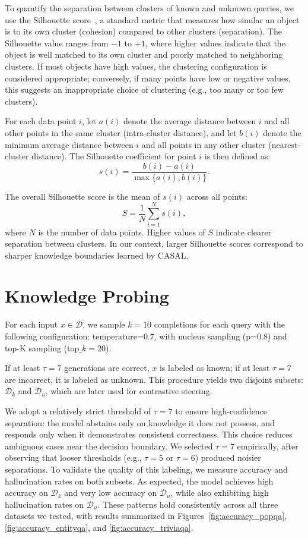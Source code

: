 \documentclass{article} %
\newcommand{\known}[1]{\textcolor{KnownGreen}{#1}}
\newcommand{\unknown}[1]{\textcolor{UnknownRed}{#1}}
\begin{document}
To quantify the separation between clusters of known and unknown queries, we use the Silhouette score~\citep{rousseeuw1987silhouettes}, a standard metric that measures how similar an object is to its own cluster (cohesion) compared to other clusters (separation). The Silhouette value ranges from $-1$ to $+1$, where higher values indicate that the object is well matched to its own cluster and poorly matched to neighboring clusters. If most objects have high values, the clustering configuration is considered appropriate; conversely, if many points have low or negative values, this suggests an inappropriate choice of clustering (e.g., too many or too few clusters).

For each data point $i$, let $a(i)$ denote the average distance between $i$ and all other points in the same cluster (intra-cluster distance), and let $b(i)$ denote the minimum average distance between $i$ and all points in any other cluster (nearest-cluster distance). The Silhouette coefficient for point $i$ is then defined as:
\[
s(i) = \frac{b(i) - a(i)}{\max\{a(i), b(i)\}}.
\]

The overall Silhouette score is the mean of $s(i)$ across all points:
\[
S = \frac{1}{N} \sum_{i=1}^{N} s(i),
\]
where $N$ is the number of data points. Higher values of $S$ indicate clearer separation between clusters. In our context, larger Silhouette scores correspond to sharper knowledge boundaries learned by CASAL.

\newpage

\section{Knowledge Probing}
\label{app:probing}

For each input $x \in \mathcal{D}$, we sample $k=10$ completions for each query with the following configuration:  temperature=0.7, with nucleus sampling (p=0.8) and top-K sampling ($\text{top}\_k=20$).


If at least $\tau=7$ generations are correct, $x$ is labeled as \known{known}; if at least $\tau=7$ are incorrect, it is labeled as \unknown{unknown}. This procedure yields two disjoint subsets: \known{$\mathcal{D}_{k}$} and \unknown{$\mathcal{D}_{u}$}, which are later used for contrastive steering. 

We adopt a relatively strict threshold of $\tau=7$ to ensure high-confidence separation: the model abstains only on knowledge it does not possess, and responds only when it demonstrates consistent correctness. This choice reduces ambiguous cases near the decision boundary. We selected $\tau=7$ empirically, after observing that looser thresholds (e.g., $\tau=5$ or $\tau=6$) produced noisier separations. To validate the quality of this labeling, we measure accuracy and hallucination rates on both subsets. As expected, the model achieves high accuracy on \known{$\mathcal{D}_{k}$} and very low accuracy on \unknown{$\mathcal{D}_{u}$}, while also exhibiting high hallucination rates on \unknown{$\mathcal{D}_{u}$}. These patterns hold consistently across all three datasets we tested, with results summarized in Figures~\ref{fig:accuracy_popqa}, \ref{fig:accuracy_entityqa}, and \ref{fig:accuracy_triviaqa}.
\end{document}
